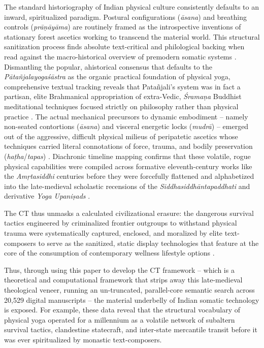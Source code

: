 \documentclass[11pt,twoside,letterpaper]{article}
\begin{document}
The standard historiography of Indian physical culture consistently defaults to an inward, spiritualized paradigm. Postural configurations (\textit{āsana}) and breathing controls (\textit{prāṇāyāma}) are routinely framed as the introspective inventions of stationary forest ascetics working to transcend the material world. This structural sanitization process finds absolute text-critical and philological backing when read against the macro-historical overview of premodern somatic systems \citep{Mallinson2017}. Dismantling the popular, ahistorical consensus that defaults to the \textit{Pātañjalayogaśāstra} as the organic practical foundation of physical yoga, comprehensive textual tracking reveals that Patañjali’s system was in fact a partisan, elite Brahmanical appropriation of extra-Vedic, \textit{Śramaṇa} Buddhist meditational techniques focused strictly on philosophy rather than physical practice \citep{Mallinson2017}. The actual mechanical precursors to dynamic embodiment – namely non-seated contortions (\textit{āsana}) and visceral energetic locks (\textit{mudrā}) – emerged out of the aggressive, difficult physical milieus of peripatetic ascetics whose techniques carried literal connotations of force, trauma, and bodily preservation (\textit{haṭha}/\textit{tapas}) \citep{Mallinson2017}. Diachronic timeline mapping confirms that these volatile, rogue physical capabilities were compiled across formative eleventh-century works like the \textit{Amṛtasiddhi} centuries before they were forcefully flattened and alphabetized into the late-medieval scholastic recensions of the \textit{Siddhasiddhāntapaddhati} and derivative \textit{Yoga Upaniṣads} \citep{Birch2024, Mallinson2017}.

The CT thus unmasks a calculated civilizational erasure: the dangerous survival tactics engineered by criminalized frontier outgroups to withstand physical trauma were systematically captured, enclosed, and moralized by elite text-composers to serve as the sanitized, static display technologies that feature at the core of the consumption of contemporary wellness lifestyle options \citep{Debnath2024, Mallinson2017, mccartney2021}.

Thus, through using this paper to develop the CT framework -- which is a theoretical and computational framework that strips away this late-medieval theological veneer, running an un-truncated, parallel-core semantic search across 20,529 digital manuscripts -- the material underbelly of Indian somatic technology is exposed. For example, these data reveal that the structural vocabulary of physical yoga operated for a millennium as a volatile network of subaltern survival tactics, clandestine statecraft, and inter-state mercantile transit before it was ever spiritualized by monastic text-composers.
\end{document}
